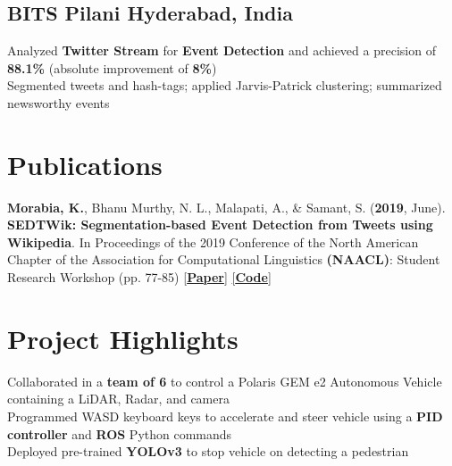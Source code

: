 \documentclass[]{Resume}
\begin{document}
\subsection{BITS Pilani \hfill \normalfont Hyderabad, India}
\pt Analyzed \textbf{Twitter Stream} for \textbf{Event Detection} and achieved a precision of \textbf{88.1\%} (absolute improvement of \textbf{8\%}) \\
\pt Segmented tweets and hash-tags; applied Jarvis-Patrick clustering; summarized newsworthy events 
\sectionsep

\section{Publications} 
\hrulefill 

\textbf{Morabia, K.}, Bhanu Murthy, N. L., Malapati, A., \& Samant, S. (\textbf{2019}, June). \textbf{SEDTWik: Segmentation-based Event Detection from Tweets using Wikipedia}. In Proceedings of the 2019 Conference of the North American Chapter of the Association for Computational Linguistics \textbf{(NAACL)}: Student Research Workshop (pp. 77-85) \href{https://www.aclweb.org/anthology/N19-3011/}{[\textbf{Paper}]} \href{https://github.com/kevalmorabia97/SEDTWik-Event-Detection-from-Tweets}{[\textbf{Code}]}
\sectionsep

\section{Project Highlights}
\hrulefill


\pt Collaborated in a \textbf{team of 6} to control a Polaris GEM e2 Autonomous Vehicle containing a LiDAR, Radar, and camera \\
\pt Programmed WASD keyboard keys to accelerate and steer vehicle using a \textbf{PID controller} and \textbf{ROS} Python commands \\
\pt Deployed pre-trained \textbf{YOLOv3} to stop vehicle on detecting a pedestrian
\sectionsep
\end{document}
